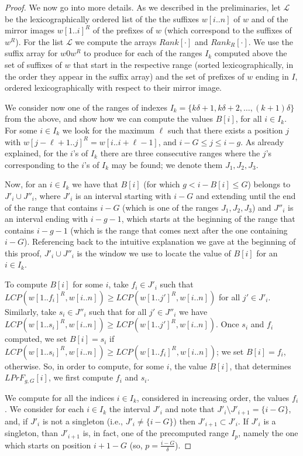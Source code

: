 \documentclass[final]{dmtcs-episciences}
\newcommand{\LCP}{{\mathit{LCP}}}
\newcommand{\LPF}{{\mathit{LPrF}}}
\begin{document}
\begin{proof}
We now go into more details. As we described in the preliminaries, let ${\mathcal L}$ be the lexicographically ordered list of the the suffixes $w[i..n]$ of $w$ and of the mirror images $w[1..i]^R$ of the prefixes of $w$ (which correspond to the suffixes of $w^R$). For the list ${\mathcal L}$ we compute the arrays $Rank[\cdot]$ and $Rank_R[\cdot]$. 
We use the suffix array for $w0w^R$ to produce for each of the ranges $I_k$ computed above the set of suffixes of $w$ that start in the respective range (sorted lexicographically, in the order they appear in the suffix array) and the set of prefixes of $w$ ending in $I$, ordered lexicographically with respect to their mirror image. 

We consider now one of the ranges of indexes $I_k=\{k\delta+1,k\delta+2,\ldots, (k+1)\delta\}$ from the above, and show how we can compute the values $B[i]$, for all $i\in I_k$. For some $i\in I_k$ we look for the maximum $\ell$ such that there exists a position $j$ with $w[j-\ell+1..j]^R=w[i..i+\ell-1]$, and $i-G\leq j\leq i-g$. As already explained, for the $i$'s of $I_k$ there are three consecutive ranges where the $j$'s corresponding to the $i$'s of $I_k$ may be found; we denote them $J_1,J_2,J_3$. 

Now, for an $i\in I_k$ we have that $B[i]$ (for which $g<i-B[i]\leq G$) belongs to $J'_i\cup J''_i$, where $J'_i$ is an interval starting with $i-G$ and extending until the end of the range that contains $i-G$ (which is one of the ranges $J_1,J_2,J_3$) and $J''_i$ is an interval ending with $i-g-1$, which starts at the beginning of the range that contains $i-g-1$ (which is the range that comes next after the one containing $i-G$). Referencing back to the intuitive explanation we gave at the beginning of this proof, $J'_i\cup J''_i$ is the window we use to locate the value of $B[i]$ for an $i\in I_k$.  

To compute $B[i]$ for some $i$, take $f_i\in J'_i$ such that $\LCP(w[1..f_i]^R,w[i..n])\geq \LCP(w[1..j']^R,w[i..n])$ for all $j'\in J'_i$. Similarly, take $s_i\in J''_i$ such that for all $j'\in J''_i$ we have $\LCP(w[1..s_i]^R,w[i..n])\geq \LCP(w[1..j']^R,w[i..n])$. Once $s_i$ and $f_i$ computed, we set $B[i]=s_i$ if $\LCP(w[1..s_i]^R,w[i..n])\geq \LCP(w[1..f_i]^R,w[i..n])$; we set $B[i]=f_i$, otherwise. So, in order to compute, for some $i$, the value $B[i]$, that determines $\LPF_{g,G}[i] $,  we first compute $f_i$ and $s_i$.

We compute for all the indices $i\in I_k$, considered in increasing order, the values $f_i$. 
We consider for each $i\in I_k$ the interval $J'_i$ and note that $J'_i\setminus J'_{i+1}=\{i-G\}$, and, if $J'_i$ is not a singleton (i.e., $J'_i\neq \{i-G\}$) then $J'_{i+1}\subset J'_i$. 
If $J'_i$ is a singleton, than $J'_{i+1}$ is, in fact, one of the precomputed range $I_{p}$, namely the one which starts on position $i+1-G$ (so, $p=\frac{i-G}{\delta}$). 
 

\end{proof}
\end{document}
